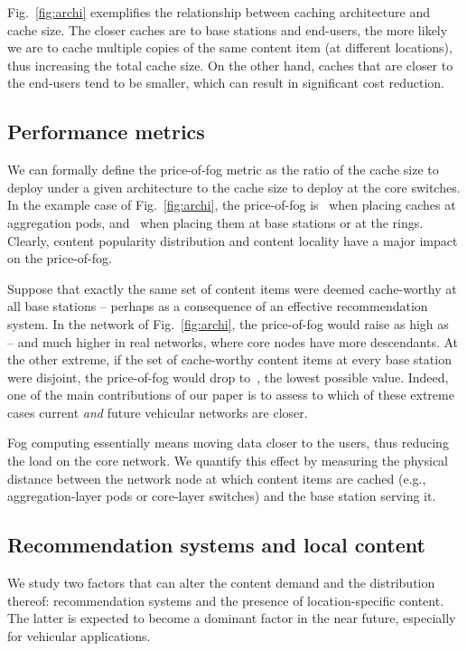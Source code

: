 \documentclass{sig-alternate-05-2015}
\newcommand{\Fig}[1]{Fig.~\ref{fig:#1}}
\begin{document}
\Fig{archi} exemplifies the relationship between caching architecture
and cache size. The closer caches are to base stations and end-users,
the more likely we are to cache multiple copies of the same content
item (at different locations), thus increasing the total cache
size. On the other hand, caches that are closer to the end-users tend to be smaller, which can result in significant cost reduction.

\subsection{Performance metrics}
\label{sec:metrics}

We can formally define the price-of-fog metric as the ratio of the cache size to deploy under a given architecture to the cache size to deploy at the core switches. In the example case of \Fig{archi}, the price-of-fog is~ when placing caches at aggregation pods, and~ when placing them at base stations or at the rings. Clearly, content popularity distribution and content locality have a major impact on the price-of-fog.

Suppose that exactly the same set of content items were deemed cache-worthy at all base stations -- perhaps as a consequence of an effective recommendation system. In the network of \Fig{archi}, the price-of-fog would raise as high as~ -- and much higher in real networks, where core nodes have more descendants. At the other extreme, if the set of cache-worthy content items at every base station were disjoint, the price-of-fog would drop to~, the lowest possible value. Indeed, one of the main contributions of our paper is to assess to which of these extreme cases current {\em and} future vehicular networks are closer.

Fog computing essentially means moving data closer to the users, thus reducing the load on the core network. We quantify this effect by measuring the physical distance between the network node at which content items are cached (e.g., aggregation-layer pods or core-layer switches) and the base station serving it.

\subsection{Recommendation systems and local content}
\label{sec:recloc}

We study two factors that can alter the content demand and the distribution thereof: recommendation systems and the presence of location-specific content. The latter is expected to become a dominant factor in the near future, especially for vehicular applications.
\end{document}
